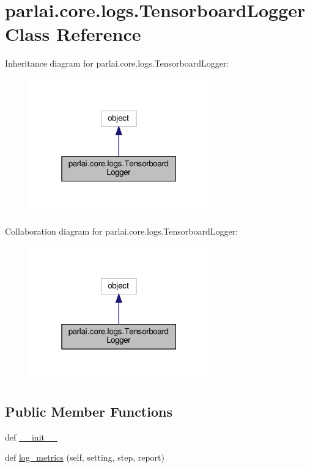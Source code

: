 \hypertarget{classparlai_1_1core_1_1logs_1_1TensorboardLogger}{}\section{parlai.\+core.\+logs.\+Tensorboard\+Logger Class Reference}
\label{classparlai_1_1core_1_1logs_1_1TensorboardLogger}


Inheritance diagram for parlai.\+core.\+logs.\+Tensorboard\+Logger\+:\nopagebreak
\begin{figure}[H]
\begin{center}
\leavevmode
\includegraphics[width=220pt]{dc/d92/classparlai_1_1core_1_1logs_1_1TensorboardLogger__inherit__graph}
\end{center}
\end{figure}


Collaboration diagram for parlai.\+core.\+logs.\+Tensorboard\+Logger\+:\nopagebreak
\begin{figure}[H]
\begin{center}
\leavevmode
\includegraphics[width=220pt]{d6/d20/classparlai_1_1core_1_1logs_1_1TensorboardLogger__coll__graph}
\end{center}
\end{figure}
\subsection*{Public Member Functions}
\begin{DoxyCompactItemize}
\item 
def \hyperlink{classparlai_1_1core_1_1logs_1_1TensorboardLogger_a32a693076ca10238b30d06743c841ab4}{\+\_\+\+\_\+init\+\_\+\+\_\+}
\item 
def \hyperlink{classparlai_1_1core_1_1logs_1_1TensorboardLogger_adf20c983722dcd7ff933aaf9dab672f4}{log\+\_\+metrics} (self, setting, step, report)
\end{DoxyCompactItemize}
